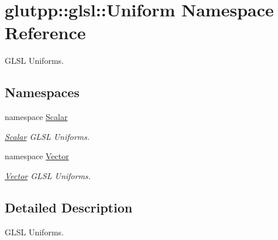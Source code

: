 \hypertarget{namespaceglutpp_1_1glsl_1_1Uniform}{\section{glutpp\-:\-:glsl\-:\-:\-Uniform \-Namespace \-Reference}
\label{namespaceglutpp_1_1glsl_1_1Uniform}
}


\-G\-L\-S\-L \-Uniforms.  


\subsection*{\-Namespaces}
\begin{DoxyCompactItemize}
\item 
namespace \hyperlink{namespaceglutpp_1_1glsl_1_1Uniform_1_1Scalar}{\-Scalar}
\begin{DoxyCompactList}\small\item\em \hyperlink{namespaceglutpp_1_1glsl_1_1Uniform_1_1Scalar}{\-Scalar} \-G\-L\-S\-L \-Uniforms. \end{DoxyCompactList}\item 
namespace \hyperlink{namespaceglutpp_1_1glsl_1_1Uniform_1_1Vector}{\-Vector}
\begin{DoxyCompactList}\small\item\em \hyperlink{namespaceglutpp_1_1glsl_1_1Uniform_1_1Vector}{\-Vector} \-G\-L\-S\-L \-Uniforms. \end{DoxyCompactList}\end{DoxyCompactItemize}


\subsection{\-Detailed \-Description}
\-G\-L\-S\-L \-Uniforms. 